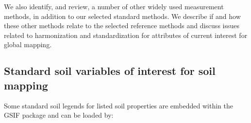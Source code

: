 \documentclass[graybox,natbib,nospthms,UStrade]{svmono}
\begin{document}
We also identify, and review, a number of other widely used measurement
methods, in addition to our selected standard methods. We describe if and
how these other methods relate to the selected reference methods and
discuss issues related to harmonization and standardization for
attributes of current interest for global mapping.

\hypertarget{standard-soil-variables-of-interest-for-soil-mapping}{%
\subsection{Standard soil variables of interest for soil mapping}\label{standard-soil-variables-of-interest-for-soil-mapping}}

Some standard soil legends for listed soil properties are embedded
within the GSIF package and can be loaded by:
\end{document}
